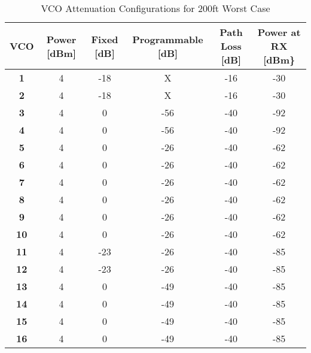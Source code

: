 \begin{table}[]
\begin{tabular}{c||ccccc}
\textbf{VCO} & Power {[}dBm{]} & Fixed {[}dB{]} & Programmable {[}dB{]} & Path Loss {[}dB{]} & Power at RX {[}dBm\} \\ \hline
\textbf{1}   & 4               & -18              & X                     & -16                & -30                  \\
\textbf{2}   & 4               & -18              & X                     & -16                & -30                  \\ \hline


\textbf{3}   & 4               & 0              & -56                   & -40                & -92                  \\
\textbf{4}   & 4               & 0              & -56                   & -40                & -92                   \\ \hline


\textbf{5}   & 4               & 0              & -26                    & -40                & -62                 \\
\textbf{6}   & 4               & 0              & -26                    & -40 			& -62                  \\
\textbf{7}   & 4               & 0              & -26                    & -40                & -62                  \\
\textbf{8}   & 4               & 0             & -26                    & -40                & -62                  \\ \hline


\textbf{9}   & 4               & 0              & -26                   & -40                & -62                  \\
\textbf{10}  & 4               & 0              & -26                   & -40                & -62                  \\
\textbf{11}  & 4               & -23            & -26                   & -40               & -85                  \\
\textbf{12}  & 4               & -23             & -26                   & -40                & -85                  \\ \hline


\textbf{13}  & 4               & 0              & -49                   & -40                & -85                  \\
\textbf{14}  & 4               & 0              & -49                   & -40                & -85                  \\
\textbf{15}  & 4               & 0              & -49                   & -40                & -85                  \\
\textbf{16}  & 4               & 0              & -49                   & -40                & -85                 
\end{tabular}
\caption{VCO Attenuation Configurations for 200ft Worst Case}
\label{tab:VCO_Pow}
\end{table}
